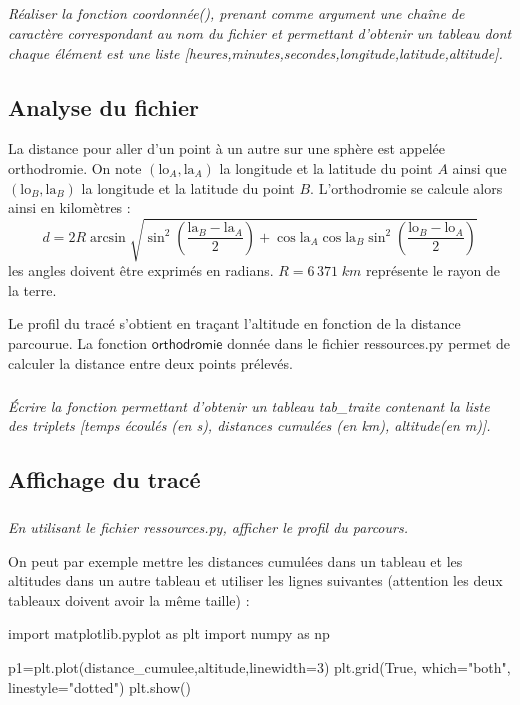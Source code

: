 \documentclass[10pt,oneside]{article}
\begin{document}
\subparagraph{}
\textit{Réaliser la fonction \textsf{coordonnée()}, prenant comme argument une chaîne de caractère correspondant au nom du fichier et permettant d'obtenir un tableau dont chaque élément est une liste \textsf{[heures,minutes,secondes,longitude,latitude,altitude]}.}


\subsection{Analyse du fichier}
La distance pour aller d'un point à un autre sur une sphère est appelée orthodromie. On note $(\text{lo}_A,\text{la}_A)$ la longitude et la latitude du point $A$ ainsi que $(\text{lo}_B,\text{la}_B)$ la longitude et la latitude du point $B$. L'orthodromie se calcule alors ainsi en kilomètres : 
$$
d = 2R\arcsin \sqrt{\sin^2\left( \dfrac{\text{la}_B-\text{la}_A}{2}\right) + \cos \text{la}_A \cos \text{la}_B \sin^2\left( \dfrac{\text{lo}_B-\text{lo}_A}{2}\right)}
$$
les angles doivent être exprimés en radians. $R=6\,371\; km$ représente le rayon de la terre.

Le profil du tracé s'obtient en traçant l'altitude en fonction de la distance parcourue. La fonction $\textsf{orthodromie}$ donnée dans le fichier \textsf{ressources.py} permet de calculer la distance entre deux points prélevés.

\subparagraph{}
\textit{Écrire la fonction permettant d'obtenir un tableau \textsf{tab\_traite} contenant la liste des triplets \textsf{[temps écoulés (en s), distances cumulées (en km), altitude(en m)]}.}


\subsection{Affichage du tracé}

\subparagraph{}
\textit{En utilisant le fichier \textsf{ressources.py}, afficher le profil du parcours.}


\begin{py}
On peut par exemple mettre les distances cumulées dans un tableau et les altitudes dans un autre tableau et utiliser les lignes suivantes (attention les deux tableaux doivent avoir la même taille) :
\end{py}

\begin{py}
\begin{python}
import matplotlib.pyplot as plt
import numpy as np

p1=plt.plot(distance_cumulee,altitude,linewidth=3)
plt.grid(True, which="both", linestyle="dotted")
plt.show()
\end{python}
\end{py}
\end{document}
